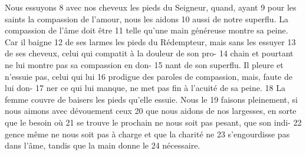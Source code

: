 Nous essuyons	 
8	 	avec nos cheveux les pieds du Seigneur, quand, ayant	 
9	 	pour les saints la compassion de l'amour, nous les aidons	 
10	 	aussi de notre superflu. La compassion de l'âme doit être	 
11	 	telle qu'une main généreuse montre sa peine. Car il baigne	 
12	 	de ses larmes les pieds du Rédempteur, mais sans les essuyer	 
13	 	de ses cheveux, celui qui compatit à la douleur de son pro-	 
14	 	chain et pourtant ne lui montre pas sa compassion en don-	 
15	 	nant de son superflu. Il pleure et n'essuie pas, celui qui lui	 
16	 	prodigue des paroles de compassion, mais, faute de lui don-	 
17	 	ner ce qui lui manque, ne met pas fin à l'acuité de sa peine.	 
18	 	La femme couvre de baisers les pieds qu'elle essuie. Nous le	 
19	 	faisons pleinement, si nous aimons avec dévouement ceux	 
20	 	que nous aidons de nos largesses, en sorte que le besoin où	 
21	 	se trouve le prochain ne nous soit pas pesant, que son indi-	 
22	 	gence même ne nous soit pas à charge et que la charité ne	 
23	 	s'engourdisse pas dans l'âme, tandis que la main donne le	 
24	 	nécessaire.
